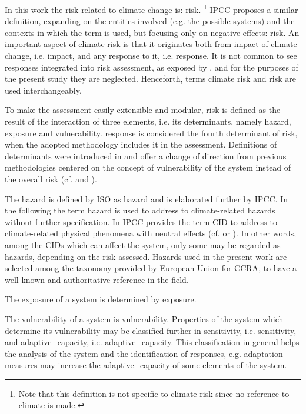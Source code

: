 In this work the \gls{risk} related to climate change is: \glsdesc{risk}.%
\footnote{Note that this definition is not specific to climate \gls{risk} since no reference to climate is made.}
\Gls{IPCC} proposes a similar definition, expanding on the entities involved (e.g. the possible systems) and the contexts in which the term is used, but focusing only on negative effects: \glsdesc{risk}.
An important aspect of climate \gls{risk} is that it originates both from \gls{impact} of climate change, i.e. \glsdesc{impact}, and any response to it, i.e. \glsdesc{response}. It is not common to see \glspl{response} integrated into risk assessment, as exposed by \cite[492]{2021SimpsonAFramework}, and for the purposes of the present study they are neglected.
Henceforth, terms climate \gls{risk} and \gls{risk} are used interchangeably.

To make the assessment easily extensible and modular, \gls{risk} is defined as the result of the interaction of three elements, i.e. its \glspl{determinant}, namely \gls{hazard}, \gls{exposure} and \gls{vulnerability}. \Gls{response} is considered the fourth \gls{determinant} of \gls{risk}, when the adopted methodology includes it in the assessment.
Definitions of \glspl{determinant} were introduced in \cite[69-70]{2012FieldManagingThe} and offer a change of direction from previous methodologies centered on the concept of \gls{vulnerability} of the system instead of the overall \gls{risk} (cf. \cite{2017GIZTheVulnerability} and \cite{2017GIZRiskSupplement}).

The \gls{hazard} is defined by \gls{ISO} as \glsdesc{hazard} and is elaborated further by \gls{IPCC}. In the following the term \gls{hazard} is used to address to climate-related \glspl{hazard} without further specification.
In \cite[2224]{2021MatthewsAnnexVII} \gls{IPCC} provides the term \gls{CID} to address to climate-related physical phenomena with neutral effects (cf. \cite[10]{2020ReisingerTheConcept} or \cite[1871]{2021RanasingheClimateChange}). In other words, among the \glspl{CID} which can affect the system, only some may be regarded as \glspl{hazard}, depending on the \gls{risk} assessed.
Hazards used in the present work are selected among the taxonomy provided by European Union for \gls{CCRA}, to have a well-known and authoritative reference in the field.\cite[177]{2024EU20212139}

The \gls{exposure} of a system is determined by \glsdesc{exposure}.

The \gls{vulnerability} of a system is \glsdesc{vulnerability}. Properties of the system which determine its \gls{vulnerability} may be classified further in \gls{sensitivity}, i.e. \glsdesc{sensitivity}, and \gls{adaptive_capacity}, i.e. \glsdesc{adaptive_capacity}. This classification in general helps the analysis of the system and the identification of responses, e.g. \gls{adaptation} measures may increase the \gls{adaptive_capacity} of some elements of the system.

